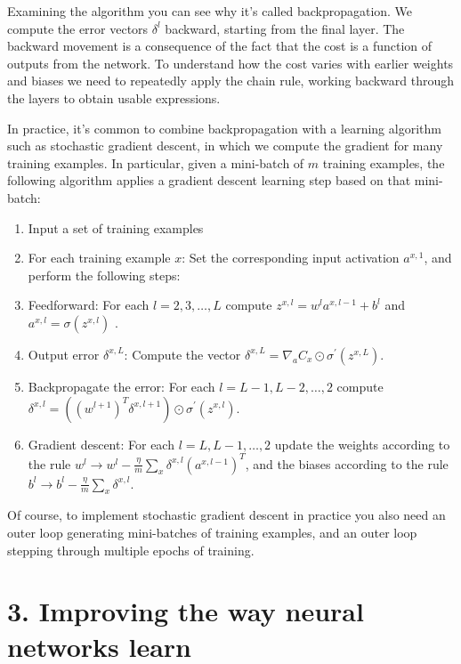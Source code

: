 \documentclass[12 pt]{article}
\begin{document}
Examining the algorithm you can see why it's called backpropagation. We
compute the error vectors $ \delta^l $ backward, starting from the
final layer. The backward movement is a consequence of the fact that the
cost is a function of outputs from the network. To understand how the
cost varies with earlier weights and biases we need to repeatedly apply
the chain rule, working backward through the layers to obtain usable
expressions.

In practice, it's common to combine backpropagation with a learning
algorithm such as stochastic gradient descent, in which we compute the
gradient for many training examples. In particular, given a mini-batch
of $ m $ training examples, the following algorithm applies a gradient
descent learning step based on that mini-batch:

\begin{enumerate}
\def\labelenumi{\arabic{enumi}.}
\item
  Input a set of training examples
\item
  For each training example
  $ x $: Set the corresponding input activation $ a^{x, 1} $, and
  perform the following steps:
\item
  Feedforward: For each $ l = 2, 3, \ldots{}, L $ compute $ z^{x,
  l} = w^l a^{x,l - 1} + b^l $ and $ a^{x, l} =
  \sigma (z^{x, l}) $ .
\item
  Output error $ \delta^{x, L} $: Compute the vector $
  \delta^{x, L} = \nabla_a C_x
  \odot \sigma^{\prime} (z^{x, L}) $.
\item
  Backpropagate the error: For each $ l = L - 1, L - 2, \ldots{}, 2 $
  compute $ \delta^{x, l} = ((w^{l + 1})^T \delta^{x,
  l + 1}) \odot \sigma^{\prime} (z^{x, l}) $.
\item
  Gradient descent: For each $ l = L, L - 1, \ldots{}, 2 $ update the
  weights according to the rule $ w^l \to w^l -
  \frac{\eta}{m}\sum_x \delta^{x, l} (a^{x, l - 1})^T $,
  and the biases according to the rule $ b^l \to b^l -
  \frac{\eta}{m} \sum_x \delta^{x, l} $.
\end{enumerate}

Of course, to implement stochastic gradient descent in practice you also
need an outer loop generating mini-batches of training examples, and an
outer loop stepping through multiple epochs of training.

\section{3. Improving the way neural networks learn}
\label{improving-the-way-neural-networks-learn}
\end{document}
